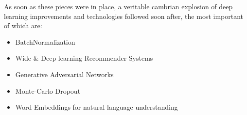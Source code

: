 As soon as these pieces were in place, a veritable cambrian explosion of deep learning improvements and technologies followed soon after, the most important of which are:

\begin{itemize}
	\item BatchNormalization
	\item Wide \& Deep learning Recommender Systems
	\item Generative Adversarial Networks 
	\item Monte-Carlo Dropout
	\item Word Embeddings for natural language understanding
\end{itemize}

